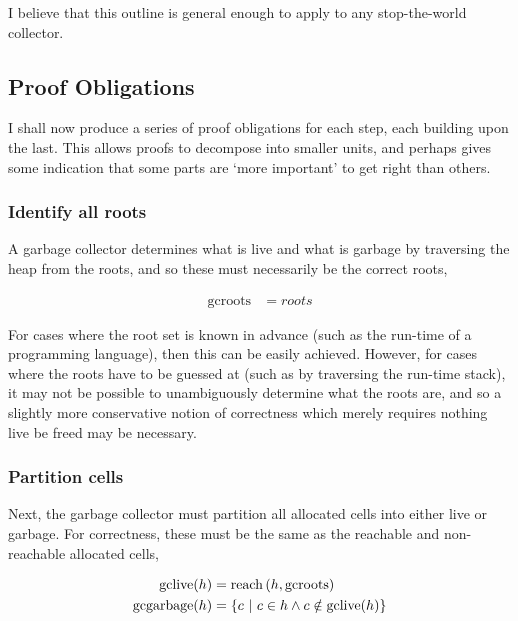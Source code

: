 I believe that this outline is general enough to apply to any
stop-the-world collector.

\subsection{Proof Obligations}
\label{sec:gc-framework-obligations}

I shall now produce a series of proof obligations for each step, each
building upon the last. This allows proofs to decompose into smaller
units, and perhaps gives some indication that some parts are `more
important' to get right than others.

\subsubsection{Identify all roots}
\label{sec:gc-framework-obligations-roots}

A garbage collector determines what is live and what is garbage by
traversing the heap from the roots, and so these must necessarily be
the correct roots,

\begin{align*}
  \mathrm{gcroots} &= roots
\end{align*}

For cases where the root set is known in advance (such as the run-time
of a programming language), then this can be easily achieved. However,
for cases where the roots have to be guessed at (such as by traversing
the run-time stack), it may not be possible to unambiguously determine
what the roots are, and so a slightly more conservative notion of
correctness which merely requires nothing live be freed may be
necessary.

\subsubsection{Partition cells}
\label{sec:gc-framework-obligations-partition}

Next, the garbage collector must partition all allocated cells into
either live or garbage. For correctness, these must be the same as the
reachable and non-reachable allocated cells,

\begin{align*}
  \mathrm{gclive}(h) &= \mathrm{reach}\left(h, \mathrm{gcroots}\right)\\
  \mathrm{gcgarbage}(h) &= \left\{c~|~c \in h \land c \notin
    \mathrm{gclive}(h)\right\}
\end{align*}


